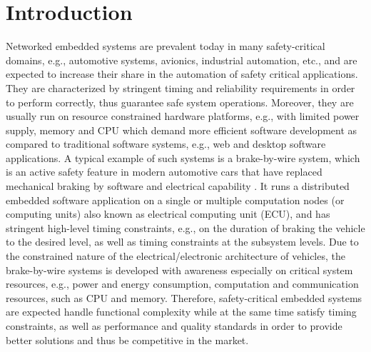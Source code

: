 \chapter{Introduction}\label{chapter_introduction}
Networked embedded systems are prevalent today in many safety-critical domains, e.g., automotive systems, avionics, industrial automation, etc., and are expected to increase their share in the automation of safety critical applications. They are characterized by stringent timing and reliability requirements in order to perform correctly, thus guarantee safe system operations. Moreover, they are usually run on resource constrained hardware platforms, e.g., with limited power supply, memory and CPU which demand more efficient software development \cite{es} as compared to traditional software systems, e.g., web and desktop software applications. A typical example of such systems is a brake-by-wire system, which is an active safety feature in modern automotive cars that have replaced mechanical braking by software and electrical capability \cite{ref}. It runs a distributed embedded software application on a single or multiple computation nodes (or computing units) also known as electrical computing unit (ECU), and has stringent high-level timing constraints, e.g., on the duration of braking the vehicle to the desired level, as well as timing constraints at the subsystem levels. Due to the constrained nature of the electrical/electronic architecture of vehicles, the brake-by-wire systems is developed with awareness especially on critical system resources, e.g., power and energy consumption, computation and communication resources, such as CPU and memory. Therefore, safety-critical embedded systems are expected handle functional complexity while at the same time satisfy timing constraints, as well as performance and quality standards in order to provide better solutions and thus be competitive in the market.

